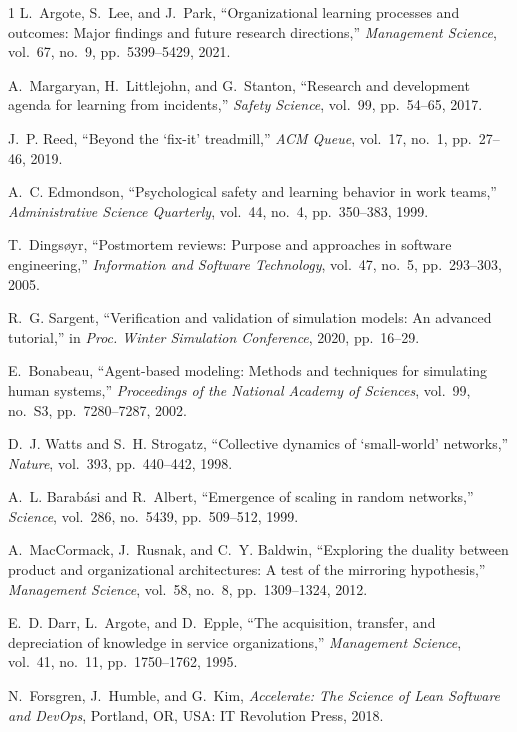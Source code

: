 \documentclass[conference,10pt]{IEEEtran}
\begin{document}
\begin{thebibliography}{1}
L.~Argote, S.~Lee, and J.~Park, ``Organizational learning processes and outcomes: Major findings and future research directions,'' \textit{Management Science}, vol.~67, no.~9, pp.~5399--5429, 2021.

A.~Margaryan, H.~Littlejohn, and G.~Stanton, ``Research and development agenda for learning from incidents,'' \textit{Safety Science}, vol.~99, pp.~54--65, 2017.

J.~P. Reed, ``Beyond the `fix-it' treadmill,'' \textit{ACM Queue}, vol.~17, no.~1, pp.~27--46, 2019.

A.~C. Edmondson, ``Psychological safety and learning behavior in work teams,'' \textit{Administrative Science Quarterly}, vol.~44, no.~4, pp.~350--383, 1999.

T.~Dings{\o}yr, ``Postmortem reviews: Purpose and approaches in software engineering,'' \textit{Information and Software Technology}, vol.~47, no.~5, pp.~293--303, 2005.

R.~G. Sargent, ``Verification and validation of simulation models: An advanced tutorial,'' in \textit{Proc. Winter Simulation Conference}, 2020, pp.~16--29.

E.~Bonabeau, ``Agent-based modeling: Methods and techniques for simulating human systems,'' \textit{Proceedings of the National Academy of Sciences}, vol.~99, no.~S3, pp.~7280--7287, 2002.

D.~J. Watts and S.~H. Strogatz, ``Collective dynamics of `small-world' networks,'' \textit{Nature}, vol.~393, pp.~440--442, 1998.

A.~L. Barab\'{a}si and R.~Albert, ``Emergence of scaling in random networks,'' \textit{Science}, vol.~286, no.~5439, pp.~509--512, 1999.

A.~MacCormack, J.~Rusnak, and C.~Y. Baldwin, ``Exploring the duality between product and organizational architectures: A test of the mirroring hypothesis,'' \textit{Management Science}, vol.~58, no.~8, pp.~1309--1324, 2012.

E.~D. Darr, L.~Argote, and D.~Epple, ``The acquisition, transfer, and depreciation of knowledge in service organizations,'' \textit{Management Science}, vol.~41, no.~11, pp.~1750--1762, 1995.

N.~Forsgren, J.~Humble, and G.~Kim, \textit{Accelerate: The Science of Lean Software and DevOps}, Portland, OR, USA: IT Revolution Press, 2018.

\end{thebibliography}
\end{document}

